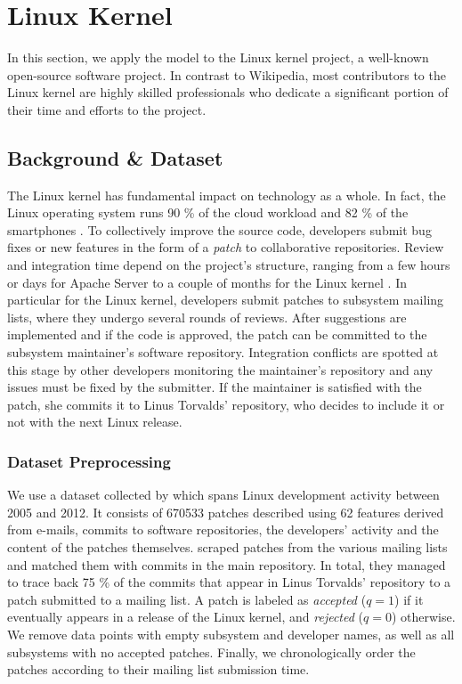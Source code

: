 \documentclass[format=sigconf]{acmart}
\newcommand{\interank}[1]{%
\ifthenelse{\isempty{#1}}{\textsc{interank}}{\textsc{interank} \emph{#1}}}
\begin{document}
\section{Linux Kernel}
\label{sec:linux}

In this section, we apply the \interank{} model to the Linux kernel project, a well-known open-source software project.
In contrast to Wikipedia, most contributors to the Linux kernel are highly skilled professionals who dedicate a significant portion of their time and efforts to the project.

\subsection{Background \& Dataset}

The Linux kernel has fundamental impact on technology as a whole.
In fact, the Linux operating system runs 90 \% of the cloud workload and 82 \% of the smartphones \citep{corbet2017linux}.
To collectively improve the source code, developers submit bug fixes or new features in the form of a \emph{patch} to collaborative repositories.
Review and integration time depend on the project's structure, ranging from a few hours or days for Apache Server \citep{rigby2008open} to a couple of months for the Linux kernel \citep{jiang2013will}.
In particular for the Linux kernel, developers submit patches to subsystem mailing lists, where they undergo several rounds of reviews.
After suggestions are implemented and if the code is approved, the patch can be committed to the subsystem maintainer's software repository.
Integration conflicts are spotted at this stage by other developers monitoring the maintainer's repository and any issues must be fixed by the submitter.
If the maintainer is satisfied with the patch, she commits it to Linus Torvalds' repository, who decides to include it or not with the next Linux release.

\subsubsection{Dataset Preprocessing}

We use a dataset collected by \citet{jiang2013will} which spans Linux development activity between 2005 and 2012.
It consists of \num{670 533} patches described using \num{62} features derived from e-mails, commits to software repositories, the developers' activity and the content of the patches themselves.
\citeauthor{jiang2013will} scraped patches from the various mailing lists and matched them with commits in the main repository.
In total, they managed to trace back 75 \% of the commits that appear in Linus Torvalds' repository to a patch submitted to a mailing list.
A patch is labeled as \emph{accepted} ($q = 1$) if it eventually appears in a release of the Linux kernel, and \emph{rejected} ($q = 0$) otherwise.
We remove data points with empty subsystem and developer names, as well as all subsystems with no accepted patches.
Finally, we chronologically order the patches according to their mailing list submission time.
\end{document}
